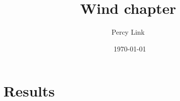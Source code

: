\documentclass[12pt]{amsart}
\title{Wind chapter}
\author{Percy Link}
\date{\currenttime \ \today} %
\begin{document}
\maketitle

\section{Results}
\end{document}
